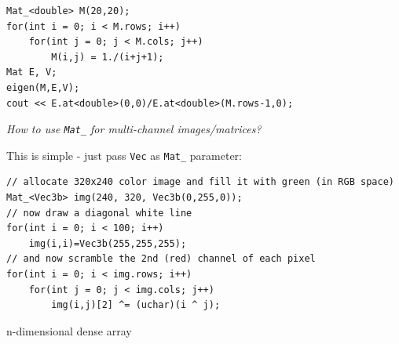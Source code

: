 \begin{lstlisting}
Mat_<double> M(20,20);
for(int i = 0; i < M.rows; i++)
    for(int j = 0; j < M.cols; j++)
        M(i,j) = 1./(i+j+1);
Mat E, V;
eigen(M,E,V);
cout << E.at<double>(0,0)/E.at<double>(M.rows-1,0);
\end{lstlisting}

\emph{How to use \texttt{Mat\_} for multi-channel images/matrices?}

This is simple - just pass \texttt{Vec} as \texttt{Mat\_} parameter:
\begin{lstlisting}
// allocate 320x240 color image and fill it with green (in RGB space)
Mat_<Vec3b> img(240, 320, Vec3b(0,255,0));
// now draw a diagonal white line
for(int i = 0; i < 100; i++)
    img(i,i)=Vec3b(255,255,255);
// and now scramble the 2nd (red) channel of each pixel
for(int i = 0; i < img.rows; i++)
    for(int j = 0; j < img.cols; j++)
        img(i,j)[2] ^= (uchar)(i ^ j);
\end{lstlisting}

\label{MatND}
n-dimensional dense array

